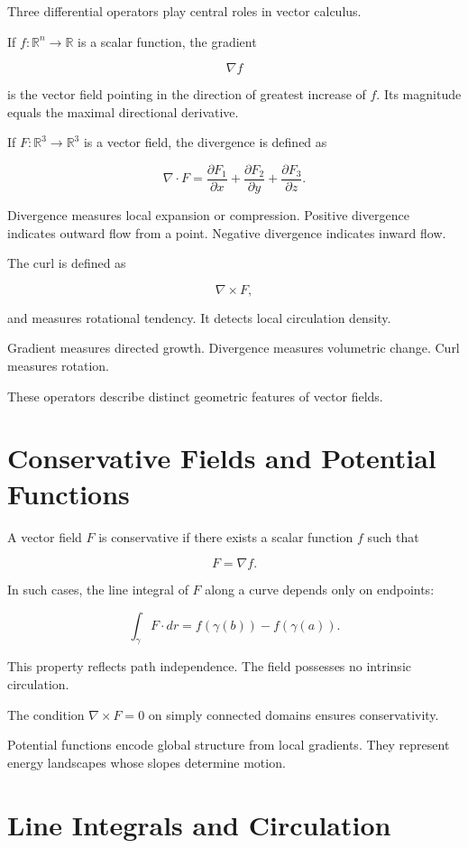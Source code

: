 \documentclass[12pt]{book}
\begin{document}
Three differential operators play central roles in vector calculus.

If $f : \mathbb{R}^n \to \mathbb{R}$ is a scalar function, the gradient

\[
\nabla f
\]

is the vector field pointing in the direction of greatest increase of $f$. Its magnitude equals the maximal directional derivative.

If $F : \mathbb{R}^3 \to \mathbb{R}^3$ is a vector field, the divergence is defined as

\[
\nabla \cdot F
=
\frac{\partial F_1}{\partial x}
+
\frac{\partial F_2}{\partial y}
+
\frac{\partial F_3}{\partial z}.
\]

Divergence measures local expansion or compression. Positive divergence indicates outward flow from a point. Negative divergence indicates inward flow.

The curl is defined as

\[
\nabla \times F,
\]

and measures rotational tendency. It detects local circulation density.

Gradient measures directed growth. Divergence measures volumetric change. Curl measures rotation.

These operators describe distinct geometric features of vector fields.

\section{Conservative Fields and Potential Functions}

A vector field $F$ is conservative if there exists a scalar function $f$ such that

\[
F = \nabla f.
\]

In such cases, the line integral of $F$ along a curve depends only on endpoints:

\[
\int_\gamma F \cdot dr = f(\gamma(b)) - f(\gamma(a)).
\]

This property reflects path independence. The field possesses no intrinsic circulation.

The condition $\nabla \times F = 0$ on simply connected domains ensures conservativity.

Potential functions encode global structure from local gradients. They represent energy landscapes whose slopes determine motion.

\section{Line Integrals and Circulation}
\end{document}
